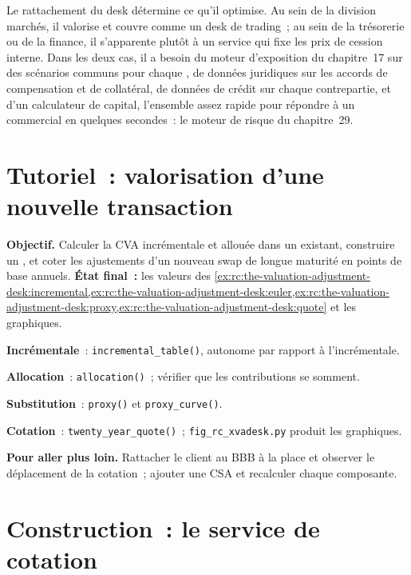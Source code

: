Le rattachement du desk détermine ce qu'il optimise. Au sein de la division marchés, il valorise et
couvre comme un desk de trading~; au sein de la trésorerie ou de la finance, il s'apparente plutôt à un service
qui fixe les prix de cession interne. Dans les deux cas, il a besoin du moteur d'exposition du chapitre~17 sur des
scénarios communs pour chaque , de données juridiques sur les accords de compensation et de collatéral, de données de crédit sur chaque
contrepartie, et d'un calculateur de capital, l'ensemble assez rapide pour répondre à un commercial en quelques secondes~:
le moteur de risque du chapitre~29.

\section{Tutoriel~: valorisation d'une nouvelle transaction}\label{tut:rc:the-valuation-adjustment-desk:tutorial}

\begin{tutorial}
\textbf{Objectif.} Calculer la CVA incrémentale et allouée dans un  existant, construire un
, et coter les ajustements d'un nouveau swap de longue maturité en points de base annuels.
\textbf{État final~:} les valeurs des
\cref{ex:rc:the-valuation-adjustment-desk:incremental,ex:rc:the-valuation-adjustment-desk:euler,ex:rc:the-valuation-adjustment-desk:proxy,ex:rc:the-valuation-adjustment-desk:quote}
et les graphiques.
\begin{tutsteps}
\item \textbf{Incrémentale}~: \texttt{incremental\_table()}, autonome par rapport à l'incrémentale.
\item \textbf{Allocation}~: \texttt{allocation()}~; vérifier que les contributions se somment.
\item \textbf{Substitution}~: \texttt{proxy()} et \texttt{proxy\_curve()}.
\item \textbf{Cotation}~: \texttt{twenty\_year\_quote()}~; \texttt{fig\_rc\_xvadesk.py} produit les graphiques.
\end{tutsteps}
\textbf{Pour aller plus loin.} Rattacher le client au BBB à la place et observer le déplacement de la cotation~; ajouter une CSA
et recalculer chaque composante.
\end{tutorial}

\section{Construction~: le service de cotation}\label{bld:rc:the-valuation-adjustment-desk:xvaquote}

